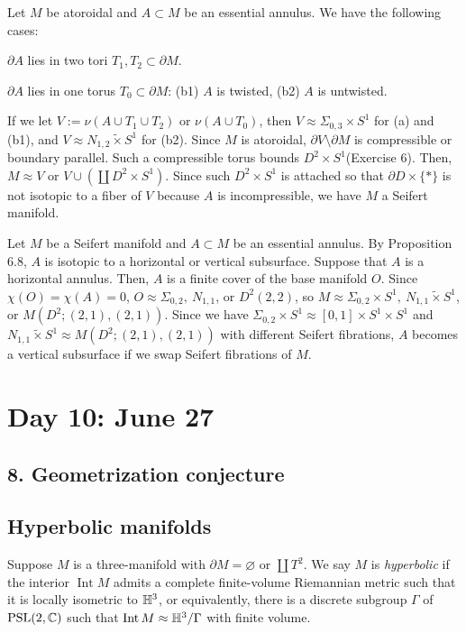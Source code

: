 \documentclass{../../../small}
\DeclareMathOperator{\Int}{Int}
\begin{document}
\begin{pf}
Let $M$ be atoroidal and $A\subset M$ be an essential annulus.
We have the following cases:
\begin{parts}
\item $\partial A$ lies in two tori $T_1,T_2\subset\partial M$.
\item $\partial A$ lies in one torus $T_0\subset\partial M$:
(b1) $A$ is twisted, (b2) $A$ is untwisted.
\end{parts}
If we let $V:=\nu(A\cup T_1\cup T_2)$ or $\nu(A\cup T_0)$, then $V\approx\Sigma_{0,3}\times S^1$ for (a) and (b1), and $V\approx N_{1,2}\tilde\times S^1$ for (b2).
Since $M$ is atoroidal, $\partial V\setminus\partial M$ is compressible or boundary parallel.
Such a compressible torus bounds $D^2\times S^1$(Exercise 6).
Then, $M\approx V$ or $V\cup(\coprod D^2\times S^1)$.
Since such $D^2\times S^1$ is attached so that $\partial D\times\{*\}$ is not isotopic to a fiber of $V$ because $A$ is incompressible, we have $M$ a Seifert manifold.
\end{pf}

\begin{pf}
Let $M$ be a Seifert manifold and $A\subset M$ be an essential annulus.
By Proposition 6.8, $A$ is isotopic to a horizontal or vertical subsurface.
Suppose that $A$ is a horizontal annulus.
Then, $A$ is a finite cover of the base manifold $O$.
Since $\chi(O)=\chi(A)=0$, $O\approx\Sigma_{0,2},\ N_{1,1}$, or $D^2(2,2)$, so $M\approx\Sigma_{0,2}\times S^1,\ N_{1,1}\tilde\times S^1$, or $M(D^2;(2,1),(2,1))$.
Since we have $\Sigma_{0,2}\times S^1\approx[0,1]\times S^1\times S^1$ and $N_{1,1}\tilde\times S^1\approx M(D^2;(2,1),(2,1))$ with different Seifert fibrations, $A$ becomes a vertical subsurface if we swap Seifert fibrations of $M$.
\end{pf}


\newpage
\setcounter{section}{9}
\section{Day 10: June 27}
\setcounter{section}{8}

\subsection*{8. Geometrization conjecture}

\subsection{Hyperbolic manifolds}
Suppose $M$ is a three-manifold with $\partial M=\varnothing$ or $\coprod T^2$.
We say $M$ is \emph{hyperbolic} if the interior $\Int M$ admits a complete finite-volume Riemannian metric such that it is locally isometric to $\mathbb{H}^3$, or equivalently, there is a discrete subgroup $\Gamma$ of $\mathrm{PSL}(2,\mathbb{C})$ such that $\Int M\approx\H^3/\Gamma$ with finite volume.
\end{document}
